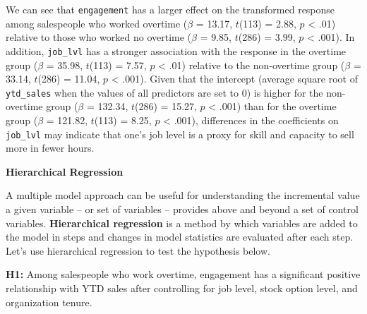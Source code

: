 \documentclass[
]{book}
\begin{document}
We can see that \texttt{engagement} has a larger effect on the transformed response among salespeople who worked overtime (\(\beta\) = 13.17, \(t\)(113) = 2.88, \(p\) \textless{} .01) relative to those who worked no overtime (\(\beta\) = 9.85, \(t\)(286) = 3.99, \(p\) \textless{} .001). In addition, \texttt{job\_lvl} has a stronger association with the response in the overtime group (\(\beta\) = 35.98, \(t\)(113) = 7.57, \(p\) \textless{} .01) relative to the non-overtime group (\(\beta\) = 33.14, \(t\)(286) = 11.04, \(p\) \textless{} .001). Given that the intercept (average square root of \texttt{ytd\_sales} when the values of all predictors are set to 0) is higher for the non-overtime group (\(\beta\) = 132.34, \(t\)(286) = 15.27, \(p\) \textless{} .001) than for the overtime group (\(\beta\) = 121.82, \(t\)(113) = 8.25, \(p\) \textless{} .001), differences in the coefficients on \texttt{job\_lvl} may indicate that one's job level is a proxy for skill and capacity to sell more in fewer hours.

\textbf{Hierarchical Regression}

A multiple model approach can be useful for understanding the incremental value a given variable -- or set of variables -- provides above and beyond a set of control variables. \textbf{Hierarchical regression} is a method by which variables are added to the model in steps and changes in model statistics are evaluated after each step. Let's use hierarchical regression to test the hypothesis below.

\textbf{H1:} Among salespeople who work overtime, engagement has a significant positive relationship with YTD sales after controlling for job level, stock option level, and organization tenure.

\providecommand{\docline}[3]{\noalign{\global\setlength{\arrayrulewidth}{#1}}\arrayrulecolor[HTML]{#2}\cline{#3}}

\setlength{\tabcolsep}{2pt}

\renewcommand*{\arraystretch}{1.5}
\end{document}
